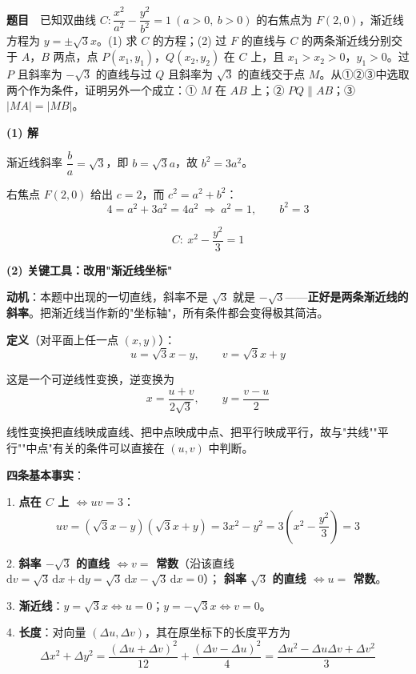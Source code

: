 
\textbf{题目}　已知双曲线 $C:\dfrac{x^{2}}{a^{2}}-\dfrac{y^{2}}{b^{2}}=1\ (a>0,\ b>0)$ 的右焦点为 $F(2,0)$，渐近线方程为 $y=\pm\sqrt3x$。(1) 求 $C$ 的方程；(2) 过 $F$ 的直线与 $C$ 的两条渐近线分别交于 $A$，$B$ 两点，点 $P\left(x_1,y_1\right)$，$Q\left(x_2,y_2\right)$ 在 $C$ 上，且 $x_1>x_2>0$，$y_1>0$。过 $P$ 且斜率为 $-\sqrt3$ 的直线与过 $Q$ 且斜率为 $\sqrt3$ 的直线交于点 $M$。从①②③中选取两个作为条件，证明另外一个成立：① $M$ 在 $AB$ 上；② $PQ\parallel AB$；③ $|MA|=|MB|$。

\par\medskip

\textbf{(1) 解}

渐近线斜率 $\dfrac ba=\sqrt3$，即 $b=\sqrt3a$，故 $b^{2}=3a^{2}$。

右焦点 $F(2,0)$ 给出 $c=2$，而 $c^{2}=a^{2}+b^{2}$：
\[4=a^{2}+3a^{2}=4a^{2}\ \Longrightarrow\ a^{2}=1,\qquad b^{2}=3\]

\[C:\ x^{2}-\frac{y^{2}}3=1\]


\par\medskip

\textbf{(2) 关键工具：改用"渐近线坐标"}

\textbf{动机}：本题中出现的一切直线，斜率不是 $\sqrt3$ 就是 $-\sqrt3$——\textbf{正好是两条渐近线的斜率}。把渐近线当作新的"坐标轴"，所有条件都会变得极其简洁。

\textbf{定义}（对平面上任一点 $(x,y)$）：
\[u=\sqrt3x-y,\qquad v=\sqrt3x+y\]

这是一个可逆线性变换，逆变换为
\[x=\frac{u+v}{2\sqrt3},\qquad y=\frac{v-u}2\]

线性变换把直线映成直线、把中点映成中点、把平行映成平行，故与"共线""平行""中点"有关的条件可以直接在 $(u,v)$ 中判断。

\textbf{四条基本事实}：

1. \textbf{点在 $C$ 上 $\iff uv=3$}：
\[uv=\left(\sqrt3x-y\right)\left(\sqrt3x+y\right)=3x^{2}-y^{2}=3\left(x^{2}-\frac{y^{2}}3\right)=3\]

2. \textbf{斜率 $-\sqrt3$ 的直线 $\iff v=$ 常数}（沿该直线 $\mathrm dv=\sqrt3\,\mathrm dx+\mathrm dy=\sqrt3\,\mathrm dx-\sqrt3\,\mathrm dx=0$）；
   \textbf{斜率 $\sqrt3$ 的直线 $\iff u=$ 常数}。

3. \textbf{渐近线}：$y=\sqrt3x\iff u=0$；$y=-\sqrt3x\iff v=0$。

4. \textbf{长度}：对向量 $(\Delta u,\Delta v)$，其在原坐标下的长度平方为
\[\Delta x^{2}+\Delta y^{2}=\frac{(\Delta u+\Delta v)^{2}}{12}+\frac{(\Delta v-\Delta u)^{2}}4=\frac{\Delta u^{2}-\Delta u\Delta v+\Delta v^{2}}3\]

